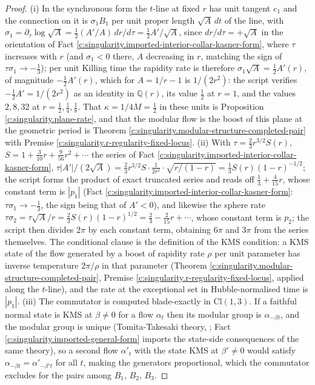 \documentclass[11pt]{article}
\theoremstyle{definition}
\theoremstyle{plain}
\providecommand{\Cl}{}\renewcommand{\Cl}{\mathrm{Cl}}
\begin{document}
\begin{proof}
(i) In the synchronous form the $t$-line at fixed $r$ has unit tangent $e_1$ and the connection on it is $\sigma_1 B_1$ per unit proper length $\sqrt{A}\,dt$ of the line, with $\sigma_1 = \partial_\tau\log\sqrt A = \tfrac12 (A'/A)\,dr/d\tau = \tfrac12 A'/\sqrt{A}$, since $dr/d\tau = +\sqrt A$ in the orientation of Fact \ref{c:singularity.imported-interior-collar-kasner-form}, where $\tau$ increases with $r$ (and $\sigma_1 < 0$ there, $A$ decreasing in $r$, matching the sign of $\tau\sigma_1 \to -\tfrac13$); per unit Killing time the rapidity rate is therefore $\sigma_1\sqrt A = \tfrac12 A'(r)$, of magnitude $-\tfrac12 A'(r)$, which for $A = 1/r - 1$ is $1/(2r^2)$: the script verifies $-\tfrac12 A' = 1/(2r^2)$ as an identity in $\mathbb{Q}(r)$, its value $\tfrac12$ at $r = 1$, and the values $2, 8, 32$ at $r = \tfrac12, \tfrac14, \tfrac18$. That $\kappa = 1/4M = \tfrac12$ in these units is Proposition \ref{c:singularity.plane-rate}, and that the modular flow is the boost of this plane at the geometric period is Theorem \ref{c:singularity.modular-structure-completed-pair} with Premise \ref{c:singularity.r-regularity-fixed-locus}. (ii) With $\tau = \tfrac23 r^{3/2} S(r)$, $S = 1 + \tfrac{3}{10}r + \tfrac{9}{56}r^2 + \cdots$ the series of Fact \ref{c:singularity.imported-interior-collar-kasner-form}, $\tau |A'|/(2\sqrt A) = \tfrac23 r^{3/2} S \cdot \tfrac{1}{2r^2} \cdot \sqrt{r/(1-r)} = \tfrac13 S(r)(1 - r)^{-1/2}$; the script forms the product of exact truncated series and reads off $\tfrac13 + \tfrac{4}{15}r$, whose constant term is $|p_1|$ (Fact \ref{c:singularity.imported-interior-collar-kasner-form}: $\tau\sigma_1 \to -\tfrac13$, the sign being that of $A' < 0$), and likewise the sphere rate $\tau\sigma_2 = \tau\sqrt{A}/r = \tfrac23 S(r)(1 - r)^{1/2} = \tfrac23 - \tfrac{2}{15}r + \cdots$, whose constant term is $p_2$; the script then divides $2\pi$ by each constant term, obtaining $6\pi$ and $3\pi$ from the series themselves. The conditional clause is the definition of the KMS condition: a KMS state of the flow generated by a boost of rapidity rate $\rho$ per unit parameter has inverse temperature $2\pi/\rho$ in that parameter (Theorem \ref{c:singularity.modular-structure-completed-pair}, Premise \ref{c:singularity.r-regularity-fixed-locus}, applied along the $t$-line), and the rate at the exceptional set in Hubble-normalised time is $|p_1|$. (iii) The commutator is computed blade-exactly in $\Cl(1,3)$. If a faithful normal state is KMS at $\beta \neq 0$ for a flow $\alpha_t$ then its modular group is $\alpha_{-\beta t}$, and the modular group is unique (Tomita-Takesaki theory, \cite[Sec.~5.3]{BR2}; Fact \ref{c:singularity.imported-general-form} imports the state-side consequences of the same theory), so a second flow $\alpha'_t$ with the state KMS at $\beta' \neq 0$ would satisfy $\alpha_{-\beta t} = \alpha'_{-\beta' t}$ for all $t$, making the generators proportional, which the commutator excludes for the pairs among $B_1$, $B_2$, $B_3$.

\end{proof}
\end{document}
